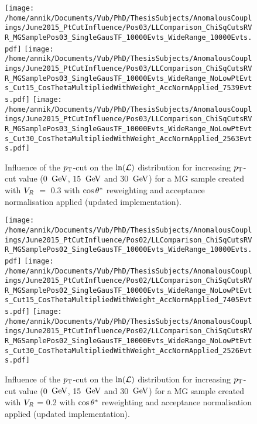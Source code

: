 \begin{figure}[h!t]
 \centering
 \texttt{[image: /home/annik/Documents/Vub/PhD/ThesisSubjects/AnomalousCouplings/June2015\_PtCutInfluence/Pos03/LLComparison\_ChiSqCutsRVR\_MGSamplePos03\_SingleGausTF\_10000Evts\_WideRange\_10000Evts.pdf]}
 \texttt{[image: /home/annik/Documents/Vub/PhD/ThesisSubjects/AnomalousCouplings/June2015\_PtCutInfluence/Pos03/LLComparison\_ChiSqCutsRVR\_MGSamplePos03\_SingleGausTF\_10000Evts\_WideRange\_NoLowPtEvts\_Cut15\_CosThetaMultipliedWithWeight\_AccNormApplied\_7539Evts.pdf]}
 \texttt{[image: /home/annik/Documents/Vub/PhD/ThesisSubjects/AnomalousCouplings/June2015\_PtCutInfluence/Pos03/LLComparison\_ChiSqCutsRVR\_MGSamplePos03\_SingleGausTF\_10000Evts\_WideRange\_NoLowPtEvts\_Cut30\_CosThetaMultipliedWithWeight\_AccNormApplied\_2563Evts.pdf]}
 \caption{Influence of the $p_{\textrm T}$-cut on the $\ln(\mathcal{L})$ distribution for increasing $p_{\textrm T}$-cut value ($0$ $\, \mathrm{GeV}$, $15$ $\, \mathrm{GeV}$ and $30$ $\, \mathrm{GeV}$) for a MG sample created with $V_{R}$ $=$ $0.3$ with $\cos \theta^{*}$ reweighting and acceptance normalisation applied (updated implementation).}
 \label{fig::AccNormCosPos03Update}
\end{figure}

\begin{figure}[h!t]
 \centering
 \texttt{[image: /home/annik/Documents/Vub/PhD/ThesisSubjects/AnomalousCouplings/June2015\_PtCutInfluence/Pos02/LLComparison\_ChiSqCutsRVR\_MGSamplePos02\_SingleGausTF\_10000Evts\_WideRange\_10000Evts.pdf]}
 \texttt{[image: /home/annik/Documents/Vub/PhD/ThesisSubjects/AnomalousCouplings/June2015\_PtCutInfluence/Pos02/LLComparison\_ChiSqCutsRVR\_MGSamplePos02\_SingleGausTF\_10000Evts\_WideRange\_NoLowPtEvts\_Cut15\_CosThetaMultipliedWithWeight\_AccNormApplied\_7405Evts.pdf]}
 \texttt{[image: /home/annik/Documents/Vub/PhD/ThesisSubjects/AnomalousCouplings/June2015\_PtCutInfluence/Pos02/LLComparison\_ChiSqCutsRVR\_MGSamplePos02\_SingleGausTF\_10000Evts\_WideRange\_NoLowPtEvts\_Cut30\_CosThetaMultipliedWithWeight\_AccNormApplied\_2526Evts.pdf]}
 \caption{Influence of the $p_{\textrm T}$-cut on the $\ln(\mathcal{L})$ distribution for increasing $p_{\textrm T}$-cut value (0 $\, \mathrm{GeV}$, 15 $\, \mathrm{GeV}$ and 30 $\, \mathrm{GeV}$) for a MG sample created with $V_{R}$ = 0.2 with $\cos \theta^{*}$ reweighting and acceptance normalisation applied (updated implementation).}
 \label{fig::AccNormCosPos02Update}
\end{figure}

